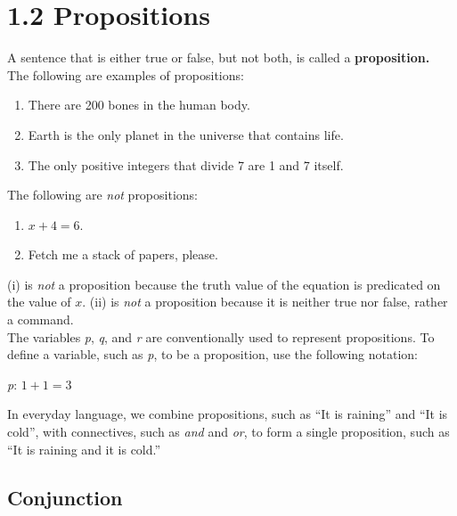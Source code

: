 \section*{1.2 Propositions}

A sentence that is either true or false, but not both, is called a \textbf{proposition.}\\

The following are examples of propositions:

\begin{enumerate}[label=(\alph*)]
\item There are 200 bones in the human body.
\item Earth is the only planet in the universe that contains life.
\item The only positive integers that divide 7 are 1 and 7 itself.
\end{enumerate}

The following are \textit{not} propositions:

\begin{enumerate}[label=(\roman*)]
\item $x + 4 = 6$.
\item Fetch me a stack of papers, please.
\end{enumerate}

(i) is \textit{not} a proposition because the truth value of the equation is predicated on the value of $x$. (ii) is \textit{not} a proposition because it is neither true nor false, rather a command.\\

The variables \textit{p}, \textit{q}, and \textit{r} are conventionally used to represent propositions.  To define a variable, such as \textit{p}, to be a proposition, use the following notation:

\begin{center}
    \textit{p}: $1 + 1 = 3$
\end{center}

In everyday language, we combine propositions, such as ``It is raining'' and ``It is cold'', with connectives, such as \textit{and} and \textit{or}, to form a single proposition, such as ``It is raining and it is cold.''

\subsection*{Conjunction}

